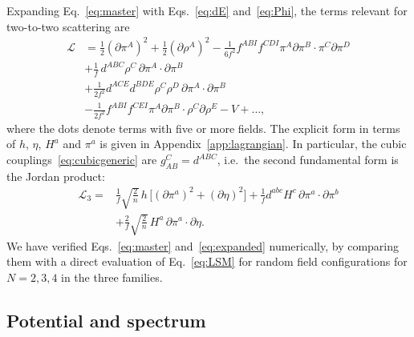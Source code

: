 \documentclass[aps,prd,twocolumn,superscriptaddress,nofootinbib,floatfix]{revtex4-2}
\theoremstyle{remark}
\newcommand{\ie}{i.e.}
\begin{document}
Expanding Eq.~\eqref{eq:master} with Eqs.~\eqref{eq:dE} and~\eqref{eq:Phi}, the terms relevant for two-to-two scattering are
\begin{align}
\mathcal{L}&=\tfrac12(\partial\pi^A)^2+\tfrac12(\partial\rho^A)^2-\frac{1}{6f^2}f^{ABI}f^{CDI}\pi^A\partial\pi^B\!\cdot\pi^C\partial\pi^D\nonumber\\
&+\frac{1}{f}\,d^{ABC}\rho^C\,\partial\pi^A\!\cdot\partial\pi^B\nonumber\\
&+\frac{1}{2f^2}d^{ACE}d^{BDE}\rho^C\rho^D\,\partial\pi^A\!\cdot\partial\pi^B\nonumber\\
&-\frac{1}{2f^2}f^{ABI}f^{CEI}\pi^A\partial\pi^B\!\cdot\rho^C\partial\rho^E-V+\dots ,
\label{eq:expanded}
\end{align}
where the dots denote terms with five or more fields. The explicit form in terms of $h$, $\eta$, $H^a$ and $\pi^a$ is given in Appendix~\ref{app:lagrangian}. In particular, the cubic couplings~\eqref{eq:cubicgeneric} are $g^C_{AB}=d^{ABC}$, \ie\ the second fundamental form is the Jordan product:
\begin{equation}
\begin{split}
\mathcal{L}_3={}&\frac{1}{f}\sqrt{\frac{2}{n}}\,h\,\big[(\partial\pi^a)^2+(\partial\eta)^2\big]+\frac1f d^{abc}H^c\,\partial\pi^a\!\cdot\partial\pi^b\\
&+\frac{2}{f}\sqrt{\frac{2}{n}}\,H^a\,\partial\pi^a\!\cdot\partial\eta .
\end{split}
\label{eq:cubic}
\end{equation}
We have verified Eqs.~\eqref{eq:master} and~\eqref{eq:expanded} numerically, by comparing them with a direct evaluation of Eq.~\eqref{eq:LSM} for random field configurations for $N=2,3,4$ in the three families.

\subsection{Potential and spectrum}
\end{document}
